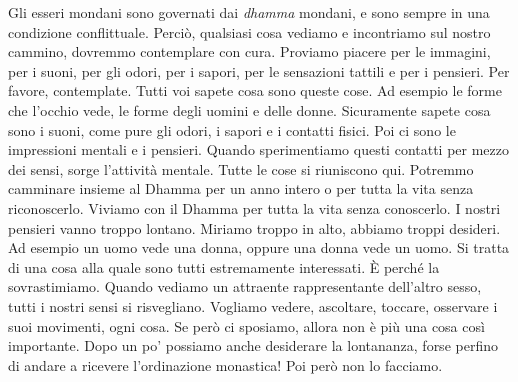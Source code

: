 Gli esseri mondani sono governati dai \emph{dhamma} mondani, e sono
sempre in una condizione conflittuale. Perciò, qualsiasi cosa vediamo e
incontriamo sul nostro cammino, dovremmo contemplare con cura. Proviamo
piacere per le immagini, per i suoni, per gli odori, per i sapori, per
le sensazioni tattili e per i pensieri. Per favore, contemplate. Tutti
voi sapete cosa sono queste cose. Ad esempio le forme che l'occhio vede,
le forme degli uomini e delle donne. Sicuramente sapete cosa sono i
suoni, come pure gli odori, i sapori e i contatti fisici. Poi ci sono le
impressioni mentali e i pensieri. Quando sperimentiamo questi contatti
per mezzo dei sensi, sorge l'attività mentale. Tutte le cose si
riuniscono qui. Potremmo camminare insieme al Dhamma per un anno intero
o per tutta la vita senza riconoscerlo. Viviamo con il Dhamma per tutta
la vita senza conoscerlo. I nostri pensieri vanno troppo lontano.
Miriamo troppo in alto, abbiamo troppi desideri. Ad esempio un uomo vede
una donna, oppure una donna vede un uomo. Si tratta di una cosa alla
quale sono tutti estremamente interessati. È perché la sovrastimiamo.
Quando vediamo un attraente rappresentante dell'altro sesso, tutti i
nostri sensi si risvegliano. Vogliamo vedere, ascoltare, toccare,
osservare i suoi movimenti, ogni cosa. Se però ci sposiamo, allora non è
più una cosa così importante. Dopo un po' possiamo anche desiderare la
lontananza, forse perfino di andare a ricevere l'ordinazione monastica!
Poi però non lo facciamo.

